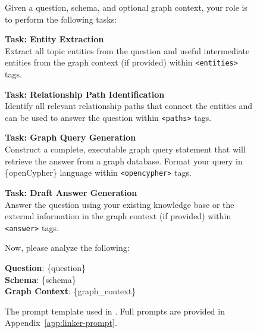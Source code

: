 
\begin{figure}
\begin{minipage}{1\columnwidth}
    \centering
\begin{tcolorbox}[title=\glink's Prompt $p$.]
        \small
        Given a question, schema, and optional graph context, your role is to perform the following tasks:
        
        \vspace{10pt}
        \textbf{Task: Entity Extraction} \\
        Extract all topic entities from the question and useful intermediate entities from the graph context (if provided) within  \texttt{<entities>} tags.

        \vspace{10pt}
        \textbf{Task: Relationship Path Identification} \\
        Identify all relevant relationship paths that connect the entities and can be used to answer the question within \texttt{<paths>} tags.

        \vspace{10pt}
        \textbf{Task: Graph Query Generation} \\
        Construct a complete, executable graph query statement that will retrieve the answer from a graph database. Format your query in \{openCypher\} language within \texttt{<opencypher>} tags.

        \vspace{10pt}
        \textbf{Task: Draft Answer Generation} \\
        Answer the question using your existing knowledge base or the external information  in the graph context (if provided) within \texttt{<answer>} tags.
        
        \vspace{10pt}
        Now, please analyze the following:
        
        \vspace{5pt}
        \textbf{Question}: \{question\} \\
        \textbf{Schema}: \{schema\} \\
        \textbf{Graph Context}: \{graph\_context\}
    \end{tcolorbox}

\caption{The prompt template used in \glink. Full prompts are provided in Appendix~\ref{app:linker-prompt}.}
\label{fig:gconnector-prompt}
\end{minipage}
\end{figure}
